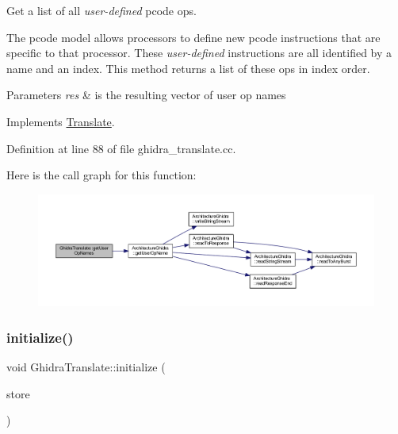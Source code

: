 Get a list of all {\itshape user-\/defined} pcode ops. 

The pcode model allows processors to define new pcode instructions that are specific to that processor. These {\itshape user-\/defined} instructions are all identified by a name and an index. This method returns a list of these ops in index order. 
\begin{DoxyParams}{Parameters}
{\em res} & is the resulting vector of user op names \\
\hline
\end{DoxyParams}


Implements \mbox{\hyperlink{class_translate_a2475ba8a71e0d514903b3b5458e6cf45}{Translate}}.



Definition at line 88 of file ghidra\+\_\+translate.\+cc.

Here is the call graph for this function\+:
\nopagebreak
\begin{figure}[H]
\begin{center}
\leavevmode
\includegraphics[width=350pt]{class_ghidra_translate_ac9f3a84c329f1432ebcc38be53b32495_cgraph}
\end{center}
\end{figure}
\mbox{\label{class_ghidra_translate_a9a2e9180ab58ec05380f62009a7822c6}} 
\subsubsection{\texorpdfstring{initialize()}{initialize()}}
{\footnotesize\ttfamily void Ghidra\+Translate\+::initialize (\begin{DoxyParamCaption}\item[{\mbox{\hyperlink{class_document_storage}{Document\+Storage}} \&}]{store }\end{DoxyParamCaption})\hspace{0.3cm}{\ttfamily [virtual]}}



